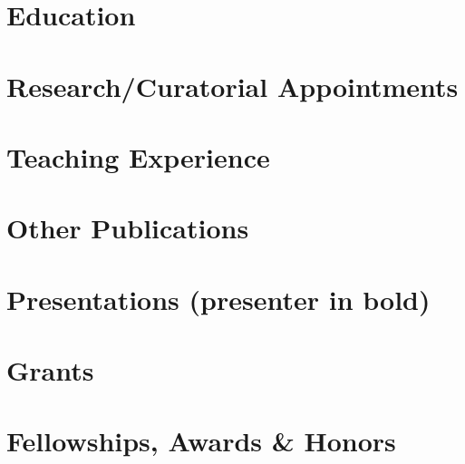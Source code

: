 

\newcommand{\longcontent}[1]{#1}

\newcommand{\oldcontent}[1]{}

\newcommand{\docTitle}{Curriculum Vitae\xspace}


\singlespacing



\section*{Education}


\section*{Research/Curatorial Appointments}


\longcontent{
\section*{Teaching Experience}

}

\nocite{*}
\printbibliography

\longcontent{
\section*{Other Publications}

}

\longcontent{
\section*{Presentations (presenter in bold)}

}

\section*{Grants}


\section*{Fellowships, Awards \& Honors}


